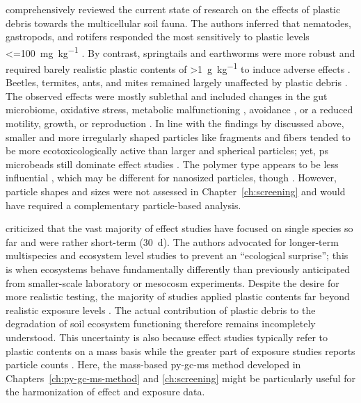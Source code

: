  comprehensively reviewed the current state of research on the effects of plastic debris towards the multicellular soil fauna. The authors inferred that nematodes, gastropods, and rotifers responded the most sensitively to plastic levels \SI{<=100}{\milli\gram\per\kilo\gram} \citep[for instance,][]{KimSizedependent2020,SongUptake2019}. By contrast, springtails and earthworms were more robust and required barely realistic plastic contents of \SI{>1}{\gram\per\kilo\gram} to induce adverse effects \citep{JuEffects2019,DingEffect2021,LahiveMicroplastic2019}. Beetles, termites, ants, and mites remained largely unaffected by plastic debris \citep[for instance,][]{PengBiodegradation2019,ZhuTrophic2018}. The observed effects were mostly sublethal and included changes in the gut microbiome, oxidative stress, metabolic malfunctioning \citep{JuEffects2019,ChenDefense2020,Rodriguez-SeijoOxidative2018}, avoidance \citep{DingEffect2021}, or a reduced motility, growth, or reproduction \citep{BootsEffects2019,LahiveMicroplastic2019}. In line with the findings by \citet{deSouzaMachadoMicroplastics2019} discussed above, smaller and more irregularly shaped particles like fragments and fibers tended to be more ecotoxicologically active than larger and spherical particles; yet, \ac{ps} microbeads still dominate effect studies \citep{BuksWhat2020}. The polymer type appears to be less influential \citep{RilligMicroplastic2020}, which may be different for nanosized particles, though \citep{RilligMicroplastic2019}. However, particle shapes and sizes were not assessed in Chapter~\ref{ch:screening} and would have required a complementary particle-based analysis.

\citet{BahoMicroplastics2021} criticized that the vast majority of effect studies have focused on single species so far and were rather short-term (\SI{30}{\day}). The authors advocated for longer-term multispecies and ecosystem level studies to prevent an ``ecological surprise''; this is when ecosystems behave fundamentally differently than previously anticipated from smaller-scale laboratory or mesocosm experiments. Despite the desire for more realistic testing, the majority of studies applied plastic contents far beyond realistic exposure levels \citep{BuksWhat2020}. The actual contribution of plastic debris to the degradation of soil ecosystem functioning therefore remains incompletely understood. This uncertainty is also because effect studies typically refer to plastic contents on a mass basis while the greater part of exposure studies reports particle counts \citep{LeuschConverting2021}. Here, the mass-based \ac{py-gc-ms} method developed in Chapters~\ref{ch:py-gc-ms-method} and \ref{ch:screening} might be particularly useful for the harmonization of effect and exposure data.

